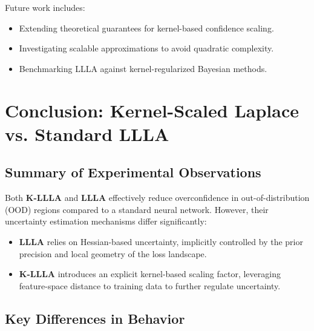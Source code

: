 \documentclass{article}
\begin{document}
Future work includes:
\begin{itemize}
    \item Extending theoretical guarantees for kernel-based confidence scaling.
    \item Investigating scalable approximations to avoid quadratic complexity.
    \item Benchmarking LLLA against kernel-regularized Bayesian methods.
\end{itemize}

\section{Conclusion: Kernel-Scaled Laplace vs. Standard LLLA}

\subsection{Summary of Experimental Observations}
Both \textbf{K-LLLA} and \textbf{LLLA} effectively reduce overconfidence in out-of-distribution (OOD) regions compared to a standard neural network. However, their uncertainty estimation mechanisms differ significantly:

\begin{itemize}
    \item \textbf{LLLA} relies on Hessian-based uncertainty, implicitly controlled by the prior precision and local geometry of the loss landscape.
    \item \textbf{K-LLLA} introduces an explicit kernel-based scaling factor, leveraging feature-space distance to training data to further regulate uncertainty.
\end{itemize}

\subsection{Key Differences in Behavior}
\end{document}
